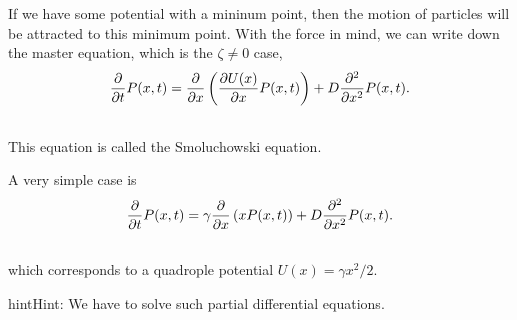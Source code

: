 \documentclass[letterpaper,10pt,english]{sphinxmanual}
\begin{document}
If we have some potential with a mininum point, then the motion of particles will be attracted to this minimum point. With the force in mind, we can write down the master equation, which is the $\zeta \neq 0$ case,
\begin{gather}
\begin{split}\frac{\partial}{\partial t} P(x,t) = \frac{\partial}{\partial x}\left( \frac{\partial U(x)}{\partial x} P(x,t)  \right) + D \frac{\partial^2}{\partial x^2} P(x,t) .\end{split}\notag\\\begin{split}\end{split}\notag
\end{gather}
This equation is called the Smoluchowski equation.

A very simple case is
\begin{gather}
\begin{split}\frac{\partial}{\partial t} P(x,t) = \gamma \frac{\partial}{\partial x}\left(x P(x,t)  \right) + D \frac{\partial^2}{\partial x^2} P(x,t) .\end{split}\notag\\\begin{split}\end{split}\notag
\end{gather}
which corresponds to a quadrople potential $U(x) = \gamma x^2/2$.

\begin{notice}{hint}{Hint:}
We have  to solve such partial differential equations.
\end{notice}
\end{document}
